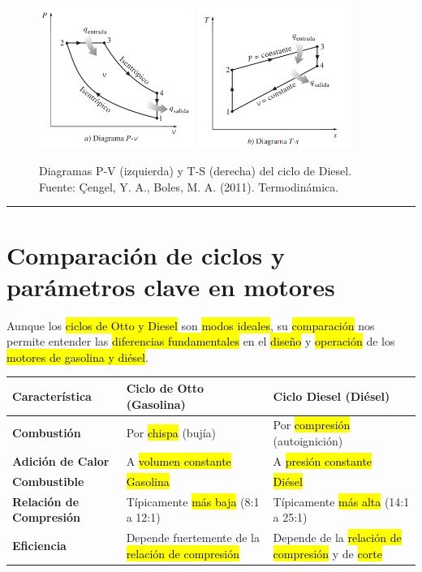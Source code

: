 \documentclass{article}
\begin{document}
\begin{figure}[h!]
    \centering
    \includegraphics[width=0.45\textwidth]{Diagrama-PV-Diesel.png}
    \hfill
    \includegraphics[width=0.45\textwidth]{diagrama-TS-Diesel.png}
    \caption{Diagramas P-V (izquierda) y T-S (derecha) del ciclo de Diesel. Fuente: Çengel, Y. A.,  Boles, M. A. (2011). Termodinámica.}
    \label{fig:diesel_diagrams}

\end{figure}

\hrule

\section{Comparación de ciclos y parámetros clave en motores}

Aunque los \hl{ciclos de Otto y Diesel} son \hl{modos ideales}, su \hl{comparación} nos permite entender las \hl{diferencias fundamentales} en el \hl{diseño} y \hl{operación} de los \hl{motores de gasolina y diésel}.

\begin{table}[h!]
\centering
\begin{tabular}{|l|l|l|}
\hline
\textbf{Característica} & \textbf{Ciclo de Otto (Gasolina)} & \textbf{Ciclo Diesel (Diésel)} \\
\hline
\textbf{Combustión} & Por \hl{chispa} (bujía) & Por \hl{compresión} (autoignición) \\
\hline
\textbf{Adición de Calor} & A \hl{volumen constante} & A \hl{presión constante} \\
\hline
\textbf{Combustible} & \hl{Gasolina} & \hl{Diésel} \\
\hline
\textbf{Relación de Compresión} & Típicamente \hl{más baja} (8:1 a 12:1) & Típicamente \hl{más alta} (14:1 a 25:1) \\
\hline
\textbf{Eficiencia} & Depende fuertemente de la \hl{relación de compresión} & Depende de la \hl{relación de compresión} y de \hl{corte} \\
\hline
\end{tabular}
\end{table}
\end{document}
